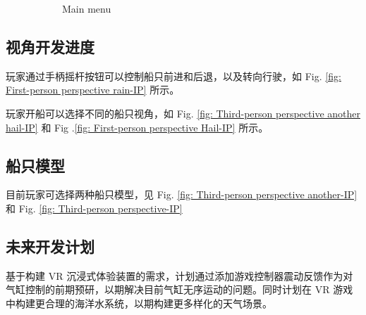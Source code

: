 \documentclass[a4paper,10pt]{article}
\begin{document}
\begin{figure}[htbp]
\begin{subfigure}{0.3\textwidth}
				\captionsetup{font=scriptsize}
				\caption{Main menu}
				\label{fig: Main menu-IP}	
			\end{subfigure}
			
			\captionsetup{font=scriptsize}
			\caption{
				\label{fig: Scene}						
			}
		\end{figure}
	
		\subsection{视角开发进度}
		
		玩家通过手柄摇杆按钮可以控制船只前进和后退，以及转向行驶，如 Fig. \ref{fig: First-person perspective rain-IP} 所示。
		
		玩家开船可以选择不同的船只视角，如 Fig. \ref{fig: Third-person perspective another hail-IP} 和 Fig .\ref{fig: First-person perspective Hail-IP} 所示。
		
		\subsection{船只模型}
		
		目前玩家可选择两种船只模型，见 Fig. \ref{fig: Third-person perspective another-IP} 和 Fig. \ref{fig: Third-person perspective-IP}
		
		\subsection{未来开发计划}
		
		基于构建 VR 沉浸式体验装置的需求，计划通过添加游戏控制器震动反馈作为对气缸控制的前期预研，以期解决目前气缸无序运动的问题。同时计划在 VR 游戏中构建更合理的海洋水系统，以期构建更多样化的天气场景。		
		

	
	
\end{document}
